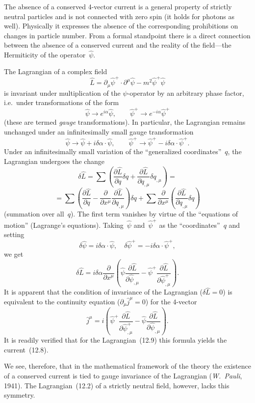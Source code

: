 The absence of a conserved 4-vector current is a general property of strictly neutral particles and is not connected with zero spin (it holds for photons as well). Physically it
expresses the absence of the corresponding prohibitions on changes in particle number. From a formal standpoint there is a direct connection between the absence of a conserved current and the reality of the field---the Hermiticity of the operator~$\hat{\psi}$.

The Lagrangian of a complex field
\begin{equation}
\hat{L} = \partial_\mu\hat{\psi}^+ \cdot \partial^\mu\hat{\psi} - m^2\hat{\psi}^+\hat{\psi}
\tag{12.9}
\end{equation}
is invariant under multiplication of the $\psi$-operator by an arbitrary phase factor, i.e.\ under transformations of the form
\begin{equation}
\hat{\psi} \to e^{i\alpha}\hat{\psi}, \qquad \hat{\psi}^+ \to e^{-i\alpha}\hat{\psi}^+
\tag{12.10}
\end{equation}
(these are termed \emph{gauge} transformations). In particular, the Lagrangian remains unchanged under an infinitesimally small gauge transformation
\begin{equation}
\hat{\psi} \to \hat{\psi} + i\delta\alpha \cdot \hat{\psi}, \qquad \hat{\psi}^+ \to \hat{\psi}^+ - i\delta\alpha \cdot \hat{\psi}^+.
\tag{12.11}
\end{equation}
Under an infinitesimally small variation of the ``generalized coordinates''~$q$, the Lagrangian undergoes the change
\[
\delta\hat{L} = \sum\left(\frac{\partial\hat{L}}{\partial q}\delta q + \frac{\partial\hat{L}}{\partial q_{,\mu}}\delta q_{,\mu}\right) =
\]
\[
= \sum\left(\frac{\partial\hat{L}}{\partial q} - \frac{\partial}{\partial x^\mu}\frac{\partial\hat{L}}{\partial q_{,\mu}}\right)\delta q + \sum\frac{\partial}{\partial x^\mu}\left(\frac{\partial\hat{L}}{\partial q_{,\mu}}\delta q\right)
\]
(summation over all~$q$). The first term vanishes by virtue of the ``equations of motion'' (Lagrange's equations). Taking~$\hat{\psi}$ and~$\hat{\psi}^+$ as the ``coordinates''~$q$ and setting
\[
\delta\hat{\psi} = i\delta\alpha \cdot \hat{\psi}, \quad \delta\hat{\psi}^+ = -i\delta\alpha \cdot \hat{\psi}^+,
\]
we get
\[
\delta\hat{L} = i\delta\alpha\frac{\partial}{\partial x^\mu}\left(\hat{\psi}\frac{\partial\hat{L}}{\partial\hat{\psi}_{,\mu}} - \hat{\psi}^+\frac{\partial\hat{L}}{\partial\hat{\psi}^+_{,\mu}}\right).
\]
It is apparent that the condition of invariance of the Lagrangian ($\delta\hat{L} = 0$) is equivalent to the continuity equation ($\partial_\mu\hat{j}^\mu{=}0$) for the 4-vector
\begin{equation}
\hat{j}^\mu = i\left(\hat{\psi}^+\frac{\partial\hat{L}}{\partial\hat{\psi}^+_{,\mu}} - \hat{\psi}\frac{\partial\hat{L}}{\partial\hat{\psi}_{,\mu}}\right).
\tag{12.12}
\end{equation}
It is readily verified that for the Lagrangian~(12.9) this formula yields the current~(12.8).

We see, therefore, that in the mathematical framework of the theory the existence of a conserved current is tied to gauge invariance of the Lagrangian (\emph{W.~Pauli}, 1941). The Lagrangian~(12.2) of a strictly neutral field, however, lacks this symmetry.


